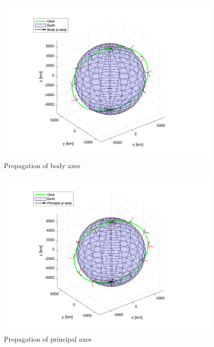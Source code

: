 \begin{figure}[H]
\centering
\includegraphics[scale=0.6]{Images/ps3_problem7c_body.png}
\caption{Propagation of body axes}
\label{fig:ps3_problem7c_body}
\end{figure}

\begin{figure}[H]
\centering
\includegraphics[scale=0.6]{Images/ps3_problem7c_principal.png}
\caption{Propagation of principal axes}
\label{fig:ps3_problem7c_principal}
\end{figure}